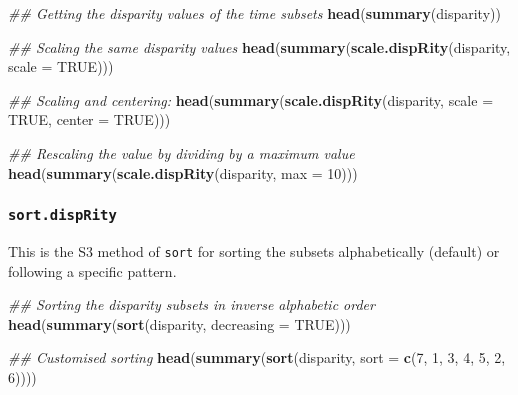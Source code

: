 \documentclass[
]{book}
\newenvironment{Shaded}{\begin{snugshade}}{\end{snugshade}}
\newcommand{\CommentTok}[1]{\textcolor[rgb]{0.56,0.35,0.01}{\textit{#1}}}
\newcommand{\DataTypeTok}[1]{\textcolor[rgb]{0.13,0.29,0.53}{#1}}
\newcommand{\DecValTok}[1]{\textcolor[rgb]{0.00,0.00,0.81}{#1}}
\newcommand{\KeywordTok}[1]{\textcolor[rgb]{0.13,0.29,0.53}{\textbf{#1}}}
\newcommand{\NormalTok}[1]{#1}
\newcommand{\OtherTok}[1]{\textcolor[rgb]{0.56,0.35,0.01}{#1}}
\begin{document}
\begin{Shaded}
\begin{Highlighting}[]
\CommentTok{\#\# Getting the disparity values of the time subsets}
\KeywordTok{head}\NormalTok{(}\KeywordTok{summary}\NormalTok{(disparity))}

\CommentTok{\#\# Scaling the same disparity values}
\KeywordTok{head}\NormalTok{(}\KeywordTok{summary}\NormalTok{(}\KeywordTok{scale.dispRity}\NormalTok{(disparity, }\DataTypeTok{scale =} \OtherTok{TRUE}\NormalTok{)))}

\CommentTok{\#\# Scaling and centering:}
\KeywordTok{head}\NormalTok{(}\KeywordTok{summary}\NormalTok{(}\KeywordTok{scale.dispRity}\NormalTok{(disparity, }\DataTypeTok{scale =} \OtherTok{TRUE}\NormalTok{, }\DataTypeTok{center =} \OtherTok{TRUE}\NormalTok{)))}

\CommentTok{\#\# Rescaling the value by dividing by a maximum value}
\KeywordTok{head}\NormalTok{(}\KeywordTok{summary}\NormalTok{(}\KeywordTok{scale.dispRity}\NormalTok{(disparity, }\DataTypeTok{max =} \DecValTok{10}\NormalTok{)))}
\end{Highlighting}
\end{Shaded}

\hypertarget{sort.disprity}{%
\subsubsection{\texorpdfstring{\texttt{sort.dispRity}}{sort.dispRity}}\label{sort.disprity}}

This is the S3 method of \texttt{sort} for sorting the subsets alphabetically (default) or following a specific pattern.

\begin{Shaded}
\begin{Highlighting}[]
\CommentTok{\#\# Sorting the disparity subsets in inverse alphabetic order}
\KeywordTok{head}\NormalTok{(}\KeywordTok{summary}\NormalTok{(}\KeywordTok{sort}\NormalTok{(disparity, }\DataTypeTok{decreasing =} \OtherTok{TRUE}\NormalTok{)))}

\CommentTok{\#\# Customised sorting}
\KeywordTok{head}\NormalTok{(}\KeywordTok{summary}\NormalTok{(}\KeywordTok{sort}\NormalTok{(disparity, }\DataTypeTok{sort =} \KeywordTok{c}\NormalTok{(}\DecValTok{7}\NormalTok{, }\DecValTok{1}\NormalTok{, }\DecValTok{3}\NormalTok{, }\DecValTok{4}\NormalTok{, }\DecValTok{5}\NormalTok{, }\DecValTok{2}\NormalTok{, }\DecValTok{6}\NormalTok{))))}
\end{Highlighting}
\end{Shaded}
\end{document}
